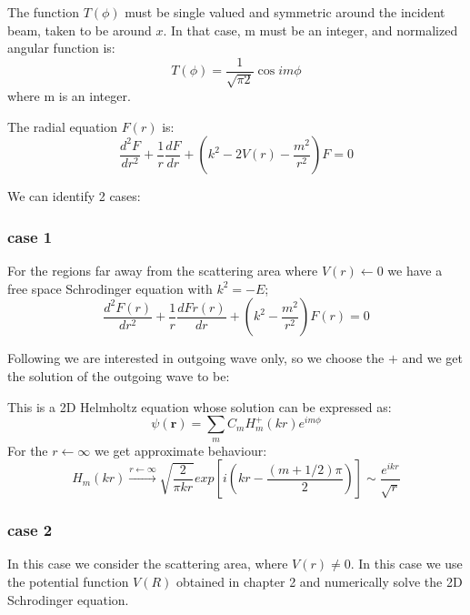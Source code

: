 The function $ T(\phi) $ must be single valued and symmetric around the incident beam, taken to be around $ x $. In that case, m must be an integer, and normalized angular function is:
\begin{equation}
T(\phi) = \frac{1}{\sqrt{\pi 2}}\cos{im\phi}
\end{equation}
where m is an integer.

The radial equation $ F(r) $ is:
\begin{equation}
\frac{d^2 F}{dr^2} + \frac{1}{r}\frac{dF}{dr} + \left(k^2 - 2V(r) - \frac{m^2}{r^2}\right)F = 0
\end{equation}

We can identify 2 cases:

\subsubsection{case 1}
 For the regions far away from the scattering area where $ V(r) \leftarrow 0 $ we have a free space Schrodinger equation with $ k^2 = -E $;
\begin{equation}\label{2DS1H}
\frac{d^2 F(r)}{dr^2} + \frac{1}{r}\frac{d Fr(r)}{dr} + \left(k^2 - \frac{m^2}{r^2}\right)F(r) = 0
\end{equation}

Following \cite{2DScatterLessons} we are interested in outgoing wave only, so we choose the $ + $ and we get the solution of the outgoing wave to be:

This is a 2D Helmholtz equation whose solution can be expressed as:
\begin{equation}\label{2DS2H}
\psi(\mathbf{r}) = \sum_{m}{C_mH_m^+(kr)e^{im\phi}}
\end{equation}
For the $ r \leftarrow \infty $ we get approximate behaviour:
\begin{equation}\label{2DS2}
H_m(kr) \xrightarrow{r \leftarrow \infty}\sqrt{\frac{2}{\pi k r}}exp\left[i\left(kr - \frac{(m + 1/2)\pi}{2}\right)\right] \sim \frac{e^{ikr}}{\sqrt{r}}
\end{equation}

\subsubsection{case 2}

In this case we consider the scattering area, where $ V(r) \neq 0 $. In this case we use the potential function $ V(R) $ obtained in chapter 2 and numerically solve the 2D Schrodinger equation.

